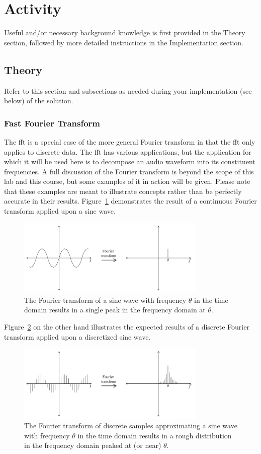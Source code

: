 \section{Activity}
Useful and/or necessary background knowledge is first provided in the Theory section, followed by more detailed instructions in the Implementation section.

\subsection{Theory}
Refer to this section and subsections as needed during your implementation (see below) of the solution.

\subsubsection{Fast Fourier Transform}
The \ac{fft} is a special case of the more general Fourier transform in that the \ac{fft} only applies to discrete data.
The \ac{fft} has various applications, but the application for which it will be used here is to decompose an audio waveform into its constituent frequencies.
A full discussion of the Fourier transform is beyond the scope of this lab and this course, but some examples of it in action will be given.
Please note that these examples are meant to illustrate concepts rather than be perfectly accurate in their results.
Figure~\ref{fig:cft} demonstrates the result of a continuous Fourier transform applied upon a sine wave.
\begin{figure}[h]
\centering
\includegraphics[width=0.8\textwidth]{CFT.pdf}
\caption{The Fourier transform of a sine wave with frequency $\theta$ in the time domain results in a single peak in the frequency domain at $\theta$.}
\label{fig:cft}
\end{figure}
Figure~\ref{fig:dft} on the other hand illustrates the expected results of a discrete Fourier transform applied upon a discretized sine wave.
\begin{figure}[h]
\centering
\includegraphics[width=0.8\textwidth]{DFT.pdf}
\caption{The Fourier transform of discrete samples approximating a sine wave with frequency $\theta$ in the time domain results in a rough distribution in the frequency domain peaked at (or near) $\theta$.}
\label{fig:dft}
\end{figure}
